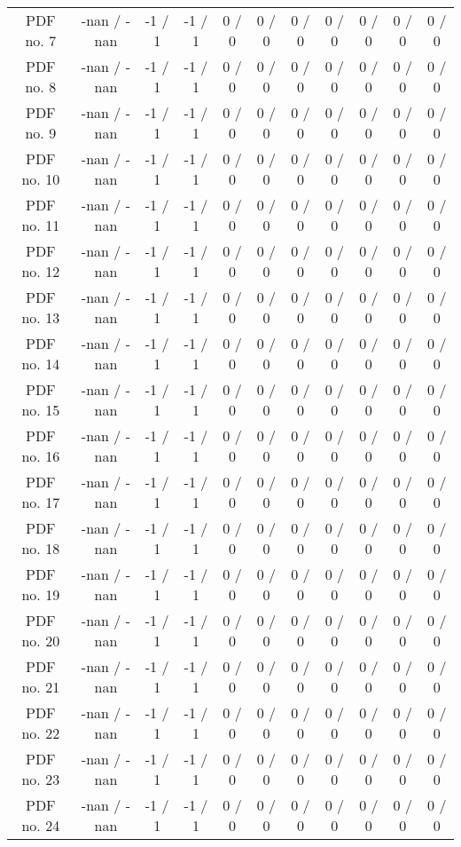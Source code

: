\begin{table}[htbp]
\begin{center}
\begin{tabular}{|c|c|c|c|c|c|c|c|c|c|c|}
  PDF no. 7 & -nan / -nan & -1 / 1 & -1 / 1 & 0 / 0 & 0 / 0 & 0 / 0 & 0 / 0 & 0 / 0 & 0 / 0 & 0 / 0 \\ 
  PDF no. 8 & -nan / -nan & -1 / 1 & -1 / 1 & 0 / 0 & 0 / 0 & 0 / 0 & 0 / 0 & 0 / 0 & 0 / 0 & 0 / 0 \\ 
  PDF no. 9 & -nan / -nan & -1 / 1 & -1 / 1 & 0 / 0 & 0 / 0 & 0 / 0 & 0 / 0 & 0 / 0 & 0 / 0 & 0 / 0 \\ 
  PDF no. 10 & -nan / -nan & -1 / 1 & -1 / 1 & 0 / 0 & 0 / 0 & 0 / 0 & 0 / 0 & 0 / 0 & 0 / 0 & 0 / 0 \\ 
  PDF no. 11 & -nan / -nan & -1 / 1 & -1 / 1 & 0 / 0 & 0 / 0 & 0 / 0 & 0 / 0 & 0 / 0 & 0 / 0 & 0 / 0 \\ 
  PDF no. 12 & -nan / -nan & -1 / 1 & -1 / 1 & 0 / 0 & 0 / 0 & 0 / 0 & 0 / 0 & 0 / 0 & 0 / 0 & 0 / 0 \\ 
  PDF no. 13 & -nan / -nan & -1 / 1 & -1 / 1 & 0 / 0 & 0 / 0 & 0 / 0 & 0 / 0 & 0 / 0 & 0 / 0 & 0 / 0 \\ 
  PDF no. 14 & -nan / -nan & -1 / 1 & -1 / 1 & 0 / 0 & 0 / 0 & 0 / 0 & 0 / 0 & 0 / 0 & 0 / 0 & 0 / 0 \\ 
  PDF no. 15 & -nan / -nan & -1 / 1 & -1 / 1 & 0 / 0 & 0 / 0 & 0 / 0 & 0 / 0 & 0 / 0 & 0 / 0 & 0 / 0 \\ 
  PDF no. 16 & -nan / -nan & -1 / 1 & -1 / 1 & 0 / 0 & 0 / 0 & 0 / 0 & 0 / 0 & 0 / 0 & 0 / 0 & 0 / 0 \\ 
  PDF no. 17 & -nan / -nan & -1 / 1 & -1 / 1 & 0 / 0 & 0 / 0 & 0 / 0 & 0 / 0 & 0 / 0 & 0 / 0 & 0 / 0 \\ 
  PDF no. 18 & -nan / -nan & -1 / 1 & -1 / 1 & 0 / 0 & 0 / 0 & 0 / 0 & 0 / 0 & 0 / 0 & 0 / 0 & 0 / 0 \\ 
  PDF no. 19 & -nan / -nan & -1 / 1 & -1 / 1 & 0 / 0 & 0 / 0 & 0 / 0 & 0 / 0 & 0 / 0 & 0 / 0 & 0 / 0 \\ 
  PDF no. 20 & -nan / -nan & -1 / 1 & -1 / 1 & 0 / 0 & 0 / 0 & 0 / 0 & 0 / 0 & 0 / 0 & 0 / 0 & 0 / 0 \\ 
  PDF no. 21 & -nan / -nan & -1 / 1 & -1 / 1 & 0 / 0 & 0 / 0 & 0 / 0 & 0 / 0 & 0 / 0 & 0 / 0 & 0 / 0 \\ 
  PDF no. 22 & -nan / -nan & -1 / 1 & -1 / 1 & 0 / 0 & 0 / 0 & 0 / 0 & 0 / 0 & 0 / 0 & 0 / 0 & 0 / 0 \\ 
  PDF no. 23 & -nan / -nan & -1 / 1 & -1 / 1 & 0 / 0 & 0 / 0 & 0 / 0 & 0 / 0 & 0 / 0 & 0 / 0 & 0 / 0 \\ 
  PDF no. 24 & -nan / -nan & -1 / 1 & -1 / 1 & 0 / 0 & 0 / 0 & 0 / 0 & 0 / 0 & 0 / 0 & 0 / 0 & 0 / 0 \\ 

\end{tabular}
\end{center}
\end{table}
